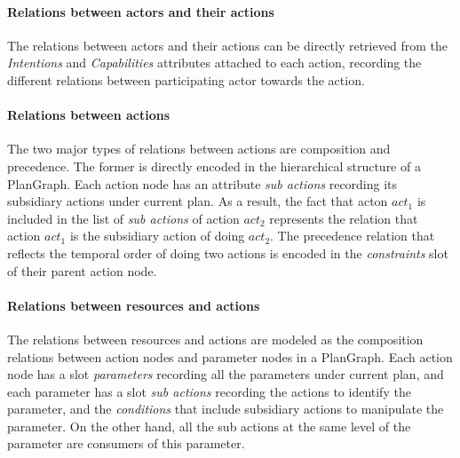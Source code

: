 \paragraph*{Relations between actors and their actions} %
\label{par:relations_between_actors_and_their_actions}
The relations between actors and their actions can be directly retrieved from the \emph{Intentions} and \emph{Capabilities} attributes attached to each action, recording the different relations between participating actor towards the action.

\paragraph*{Relations between actions} %
\label{par:relations_between_actions}
The two major types of relations between actions are composition and precedence. The former is directly encoded in the hierarchical structure of a PlanGraph. Each action node has an attribute \emph{sub actions} recording its subsidiary actions under current plan. As a result, the fact that acton $act_1$ is included in the list of \emph{sub actions} of action $act_2$ represents the relation that action $act_1$ is the subsidiary action of doing $act_2$. The precedence relation that reflects the temporal order of doing two actions is encoded in the \emph{constraints} slot of their parent action node.

\paragraph*{Relations between resources and actions} %
\label{par:relations_between_resources_and_actions}
The relations between resources and actions are modeled as the composition relations between action nodes and parameter nodes in a PlanGraph. Each action node has a slot \emph{parameters} recording all the parameters under current plan, and each parameter has a slot \emph{sub actions} recording the actions to identify the parameter, and the \emph{conditions} that include subsidiary actions to manipulate the parameter. On the other hand, all the sub actions at the same level of the parameter are consumers of this parameter.

